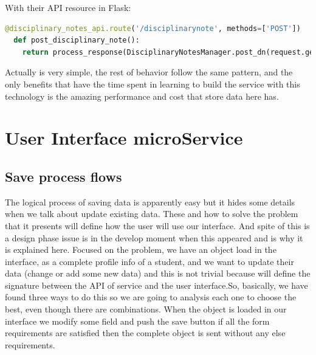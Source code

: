 \noindent With their API resource in Flask:

\begin{lstlisting}[language=python, frame=none]
  @disciplinary_notes_api.route('/disciplinarynote', methods=['POST'])
  def post_disciplinary_note():
    return process_response(DisciplinaryNotesManager.post_dn(request.get_json()))
\end{lstlisting}

\noindent Actually is very simple, the rest of behavior follow the same pattern,
and the only benefits that have the time spent in learning to build the service
with this technology is the amazing performance and cost that store data here has.

\section{User Interface microService}

\subsection{Save process flows}

The logical process of saving data is apparently easy but it hides some details
when we talk about update existing data. These and how to solve the problem that
it presents will define how the user will use our interface. And spite of this is
a design phase issue is in the develop moment when this appeared and is why it
is explained here.
\intro
Focused on the problem, we have an object load in the interface, as a complete
profile info of a student, and we want to update their data (change or add some
new data) and this is not trivial because will define the signature between the
API of service and the user interface.So, basically, we have found three ways to do this so we are going to analysis
each one to choose the best, even though there are combinations.
When the object is loaded in our interface we modify some field and push the save
button if all the form requirements are satisfied then the complete object is sent
without any else requirements.

